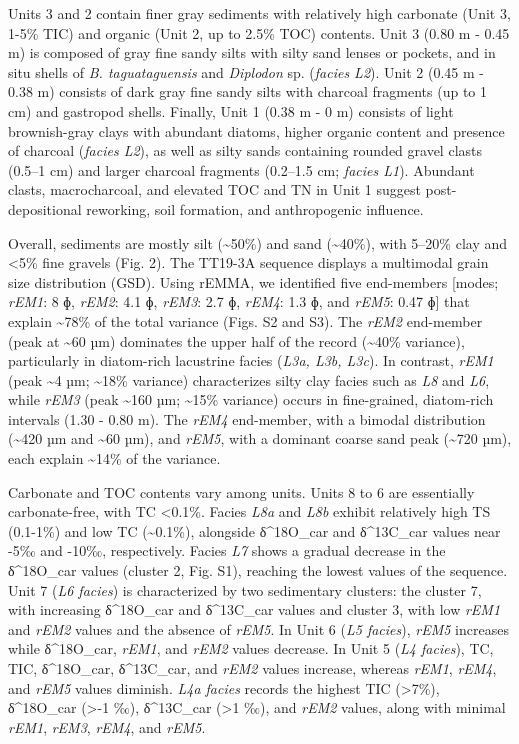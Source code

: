 \documentclass[
]{article}
\begin{document}
Units 3 and 2 contain finer gray sediments with relatively high
carbonate (Unit 3, 1-5\% TIC) and organic (Unit 2, up to 2.5\% TOC)
contents. Unit 3 (0.80 m - 0.45 m) is composed of gray fine sandy silts
with silty sand lenses or pockets, and in situ shells of \emph{B.
taguataguensis} and \emph{Diplodon} sp. (\emph{facies L2}). Unit 2 (0.45
m - 0.38 m) consists of dark gray fine sandy silts with charcoal
fragments (up to 1 cm) and gastropod shells. Finally, Unit 1 (0.38 m - 0
m) consists of light brownish-gray clays with abundant diatoms, higher
organic content and presence of charcoal (\emph{facies L2}), as well as
silty sands containing rounded gravel clasts (0.5--1 cm) and larger
charcoal fragments (0.2--1.5 cm; \emph{facies L1}). Abundant clasts,
macrocharcoal, and elevated TOC and TN in Unit 1 suggest
post-depositional reworking, soil formation, and anthropogenic
influence.

Overall, sediments are mostly silt (\textasciitilde50\%) and sand
(\textasciitilde40\%), with 5--20\% clay and \textless5\% fine gravels
(Fig. 2). The TT19-3A sequence displays a multimodal grain size
distribution (GSD). Using rEMMA, we identified five end-members
{[}modes; \emph{rEM1}: 8 ɸ, \emph{rEM2}: 4.1 ɸ, \emph{rEM3}: 2.7 ɸ,
\emph{rEM4}: 1.3 ɸ, and \emph{rEM5}: 0.47 ɸ{]} that explain
\textasciitilde78\% of the total variance (Figs. S2 and S3). The
\emph{rEM2} end-member (peak at \textasciitilde60 µm) dominates the
upper half of the record (\textasciitilde40\% variance), particularly in
diatom-rich lacustrine facies (\emph{L3a, L3b, L3c}). In contrast,
\emph{rEM1} (peak \textasciitilde4 µm; \textasciitilde18\% variance)
characterizes silty clay facies such as \emph{L8} and \emph{L6}, while
\emph{rEM3} (peak \textasciitilde160 µm; \textasciitilde15\% variance)
occurs in fine-grained, diatom-rich intervals (1.30 - 0.80 m). The
\emph{rEM4} end-member, with a bimodal distribution (\textasciitilde420
µm and \textasciitilde60 µm), and \emph{rEM5}, with a dominant coarse
sand peak (\textasciitilde720 µm), each explain \textasciitilde14\% of
the variance.

Carbonate and TOC contents vary among units. Units 8 to 6 are
essentially carbonate-free, with TC \textless0.1\%. Facies \emph{L8a}
and \emph{L8b} exhibit relatively high TS (0.1-1\%) and low TC
(\textasciitilde0.1\%), alongside δ\^{}18O\_car and δ\^{}13C\_car values
near -5‰ and -10‰, respectively. Facies \emph{L7} shows a gradual
decrease in the δ\^{}18O\_car values (cluster 2, Fig. S1), reaching the
lowest values of the sequence. Unit 7 (\emph{L6 facies}) is
characterized by two sedimentary clusters: the cluster 7, with
increasing δ\^{}18O\_car and δ\^{}13C\_car values and cluster 3, with
low \emph{rEM1} and \emph{rEM2} values and the absence of \emph{rEM5}.
In Unit 6 (\emph{L5 facies}), \emph{rEM5} increases while δ\^{}18O\_car,
\emph{rEM1}, and \emph{rEM2} values decrease. In Unit 5 (\emph{L4
facies}), TC, TIC, δ\^{}18O\_car, δ\^{}13C\_car, and \emph{rEM2} values
increase, whereas \emph{rEM1}, \emph{rEM4}, and \emph{rEM5} values
diminish. \emph{L4a facies} records the highest TIC (\textgreater7\%),
δ\^{}18O\_car (\textgreater-1 ‰), δ\^{}13C\_car (\textgreater1 ‰), and
\emph{rEM2} values, along with minimal \emph{rEM1}, \emph{rEM3},
\emph{rEM4}, and \emph{rEM5}.
\end{document}
